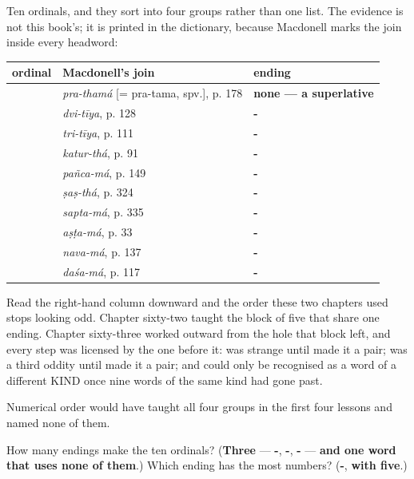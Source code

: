 \begin{grammarlens}[title={What you've built}]
Ten ordinals, and they sort into four groups rather than one list. The evidence is not this book's; it is printed in the dictionary, because Macdonell marks the join inside every headword:

\noindent
\begin{tabularx}{\linewidth}{@{}>{\raggedright\arraybackslash}X>{\raggedright\arraybackslash}X>{\raggedright\arraybackslash}X@{}}
\toprule
\textbf{ordinal} & \textbf{Macdonell's join} & \textbf{ending} \\
\midrule
\textbf{\sk{प्रथमः}} & \emph{pra-thamá} {[}= pra-tama, spv.{]}, p. 178 & \textbf{none — a superlative} \\
\textbf{\sk{द्वितीयः}} & \emph{dvi-tīya}, p. 128 & \textbf{-\sk{तीय}} \\
\textbf{\sk{तृतीयः}} & \emph{tri-tīya}, p. 111 & \textbf{-\sk{तीय}} \\
\textbf{\sk{चतुर्थः}} & \emph{katur-thá}, p. 91 & \textbf{-\sk{थ}} \\
\textbf{\sk{पञ्चमः}} & \emph{pañca-má}, p. 149 & \textbf{-\sk{म}} \\
\textbf{\sk{षष्ठः}} & \emph{ṣaṣ-thá}, p. 324 & \textbf{-\sk{थ}} \\
\textbf{\sk{सप्तमः}} & \emph{sapta-má}, p. 335 & \textbf{-\sk{म}} \\
\textbf{\sk{अष्टमः}} & \emph{aṣṭa-má}, p. 33 & \textbf{-\sk{म}} \\
\textbf{\sk{नवमः}} & \emph{nava-má}, p. 137 & \textbf{-\sk{म}} \\
\textbf{\sk{दशमः}} & \emph{daśa-má}, p. 117 & \textbf{-\sk{म}} \\
\bottomrule
\end{tabularx}

Read the right-hand column downward and the order these two chapters used stops looking odd. Chapter sixty-two taught the block of five that share one ending. Chapter sixty-three worked outward from the hole that block left, and every step was licensed by the one before it: \textbf{} was strange until \textbf{} made it a pair; \textbf{} was a third oddity until \textbf{} made it a pair; and \textbf{} could only be recognised as a word of a different KIND once nine words of the same kind had gone past.

Numerical order would have taught all four groups in the first four lessons and named none of them.
\end{grammarlens}

\begin{tcolorbox}[breakable,colback=teal!4,colframe=teal!35!black,title={Before you move on}]
How many endings make the ten ordinals? (\textbf{Three} — \textbf{-}, \textbf{-}, \textbf{-} — \textbf{and one word that uses none of them}.) Which ending has the most numbers? (\textbf{-}, \textbf{with five}.)
\end{tcolorbox}
